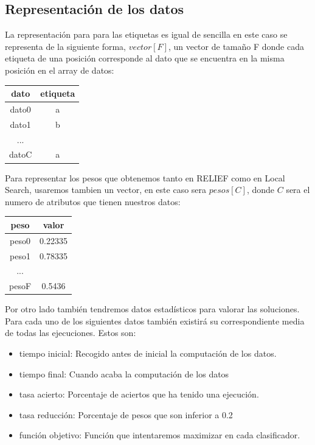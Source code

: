 \documentclass[12pt,a4paper]{article}
\begin{document}
\subsection{Representación de los datos}
La representación para para las etiquetas es igual de sencilla en este caso se representa de la siguiente forma, $vector[F]$,  un vector de tamaño F donde cada etiqueta de una posición corresponde al  dato que se encuentra en la misma posición en el array de datos:
\begin{table}[H]
	\centering
	\begin{tabular}{|c|c|}
		\hline 
		dato&  etiqueta \\
		\hline 
		dato0 & a   \\ 
		\hline 
		dato1 & b  \\ 
		\hline 
		... &    \\ 
		\hline 
		datoC & a  \\ 
		\hline 
	\end{tabular} 
\end{table}
Para representar los pesos que obtenemos tanto en RELIEF como en Local Search, usaremos tambien un vector, en este caso sera $pesos[C]$, donde $C$ sera el numero de atributos que tienen nuestros datos:
\begin{table}[H]
	\centering
	\begin{tabular}{|c|c|}
		\hline 
		peso&  valor \\
		\hline 
		peso0 & 0.22335   \\ 
		\hline 
		peso1 & 0.78335  \\ 
		\hline 
		... &    \\ 
		\hline 
		pesoF & 0.5436  \\ 
		\hline 
	\end{tabular} 
\end{table}
Por otro lado también tendremos datos estadísticos para valorar las soluciones. Para cada uno de los siguientes datos también existirá su correspondiente media de todas las ejecuciones. Estos son: \begin{itemize}
	\item tiempo inicial: Recogido antes de inicial la computación de los datos.
	\item tiempo final: Cuando acaba la computación de los datos
	\item tasa acierto: Porcentaje de aciertos que ha tenido una ejecución.
	\item tasa reducción: Porcentaje de pesos que son inferior a 0.2
	\item función objetivo: Función que intentaremos maximizar en cada clasificador.
\end{itemize}
\end{document}
